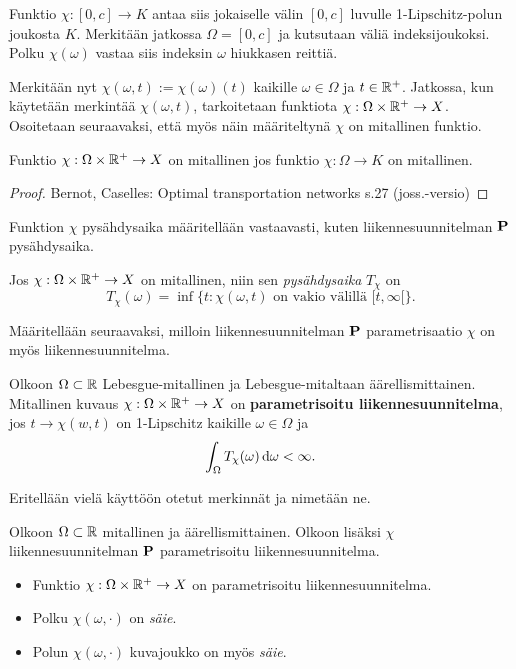Funktio $ \chi:[0, c] \to K$ antaa siis jokaiselle välin $[0, c]$ luvulle 1-Lipschitz-polun joukosta $K$. 
Merkitään jatkossa $\Omega = [0,c]$ ja kutsutaan väliä indeksijoukoksi. Polku $ \chi(\omega)$ vastaa siis indeksin $\omega$ hiukkasen reittiä.

Merkitään nyt $\chi(\omega, t) :=  \chi(\omega)(t)$ kaikille $\omega \in \Omega$ ja $t \in \R^+$. Jatkossa, kun käytetään merkintää $\chi(\omega, t)$, tarkoitetaan funktiota $\chi : \Omega \times \R^+ \to X$. Osoitetaan seuraavaksi, että myös näin määriteltynä $\chi$ on mitallinen funktio.

\begin{theorem}
    Funktio $\chi: \Omega \times \R^+ \to X $ on mitallinen jos funktio $ \chi: \Omega \to K$ on mitallinen.
\end{theorem}
\begin{proof}
Bernot, Caselles: Optimal transportation networks s.27 (joss.-versio)
\end{proof}
Funktion $\chi$ pysähdysaika määritellään vastaavasti, kuten liikennesuunnitelman $\P$ pysähdysaika.
\begin{definition}
    Jos $\chi: \Omega \times \R^+ \to X$ on mitallinen, niin sen \textit{pysähdysaika} $T_\chi$ on
    \[T_\chi (\omega) = \inf\{t : \chi(\omega, t) \text{ on vakio välillä } [t,\infty[\}.\]
\end{definition}

Määritellään seuraavaksi, milloin liikennesuunnitelman $\P$ parametrisaatio $\chi$ on myös liikennesuunnitelma.
\begin{definition} \label{def:parameterizedTP}
    Olkoon $\Omega \subset \R$ Lebesgue-mitallinen ja Lebesgue-mitaltaan äärellismittainen. Mitallinen kuvaus $\chi: \Omega \times \R^+ \to X$ on \textbf{parametrisoitu liikennesuunnitelma}, jos $t\to \chi(w,t)$ on 1-Lipschitz kaikille $\omega \in \Omega$ ja
    \[\int_\Omega T_\chi (\omega) \, \d \omega < \infty .\]
\end{definition}

Eritellään vielä käyttöön otetut merkinnät ja nimetään ne.
\begin{definition}
    Olkoon $\Omega\subset \R$ mitallinen ja äärellismittainen. Olkoon lisäksi $\chi$ liikennesuunnitelman $\P$ parametrisoitu liikennesuunnitelma.
    \begin{itemize}
        \item Funktio $\chi:\Omega \times \R^+ \to X$ on parametrisoitu liikennesuunnitelma. 
        \item Polku $\chi(\omega, \cdot)$ on \textit{säie}.
        \item Polun $\chi(\omega, \cdot)$ kuvajoukko on myös \textit{säie}.
    \end{itemize}
\end{definition}

